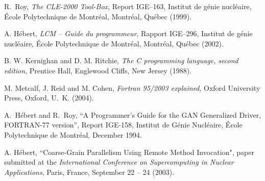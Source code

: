 \begin{thebibliography}{99}

R.~Roy,  \textsl{The CLE-2000 Tool-Box}, 
Report IGE--163, Institut de g\'enie nucl\'eaire, \'{E}cole Polytechnique de Montr\'eal,
Montr\'{e}al, Qu\'{e}bec (1999).

A. H\'ebert, \textsl{LCM -- Guide du programmeur}, 
Rapport IGE--296, Institut de g\'enie nucl\'eaire, \'{E}cole Polytechnique de Montr\'eal,
Montr\'{e}al, Qu\'{e}bec (2002).

B. W. Kernighan and D. M. Ritchie, \textsl{The C programming language, second edition},
Prentice Hall, Englewood Cliffs, New Jersey (1988).

M. Metcalf, J. Reid and M. Cohen, \textsl{Fortran 95/2003 explained},
Oxford University Press, Oxford, U.~K. (2004).

A.~H\'ebert and R.~Roy, ``A Programmer's Guide for the GAN Generalized Driver, FORTRAN-77 version'', Report IGE-158, Institut de G\'enie Nucl\'eaire, \'Ecole Polytechnique de Montr\'eal, December 1994.

A. H\'ebert, ``Coarse-Grain Parallelism Using Remote Method Invocation", paper submitted at the {\sl International Conference on Supercomputing in Nuclear Applications},
Paris, France, September 22 -- 24 (2003).

\end{thebibliography}
